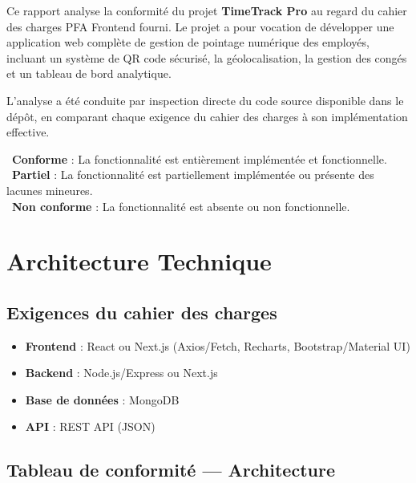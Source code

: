\documentclass[12pt,a4paper]{article}
\newcommand{\cmark}{\textcolor{vert}{\ding{51}}}
\newcommand{\xmark}{\textcolor{rouge}{\ding{55}}}
\newcommand{\pmark}{\textcolor{orange}{\ding{115}}}
\begin{document}
Ce rapport analyse la conformité du projet \textbf{TimeTrack Pro} au regard du cahier des charges PFA Frontend fourni. Le projet a pour vocation de développer une application web complète de gestion de pointage numérique des employés, incluant un système de QR code sécurisé, la géolocalisation, la gestion des congés et un tableau de bord analytique.

L'analyse a été conduite par inspection directe du code source disponible dans le dépôt, en comparant chaque exigence du cahier des charges à son implémentation effective.

\begin{tcolorbox}[colback=grislight, colframe=bleu, title=\textbf{Légende}]
\cmark~\textbf{Conforme} : La fonctionnalité est entièrement implémentée et fonctionnelle.\\
\pmark~\textbf{Partiel} : La fonctionnalité est partiellement implémentée ou présente des lacunes mineures.\\
\xmark~\textbf{Non conforme} : La fonctionnalité est absente ou non fonctionnelle.
\end{tcolorbox}

\section{Architecture Technique}

\subsection{Exigences du cahier des charges}

\begin{itemize}
    \item \textbf{Frontend} : React ou Next.js (Axios/Fetch, Recharts, Bootstrap/Material UI)
    \item \textbf{Backend} : Node.js/Express ou Next.js
    \item \textbf{Base de données} : MongoDB
    \item \textbf{API} : REST API (JSON)
\end{itemize}

\subsection{Tableau de conformité — Architecture}
\end{document}
